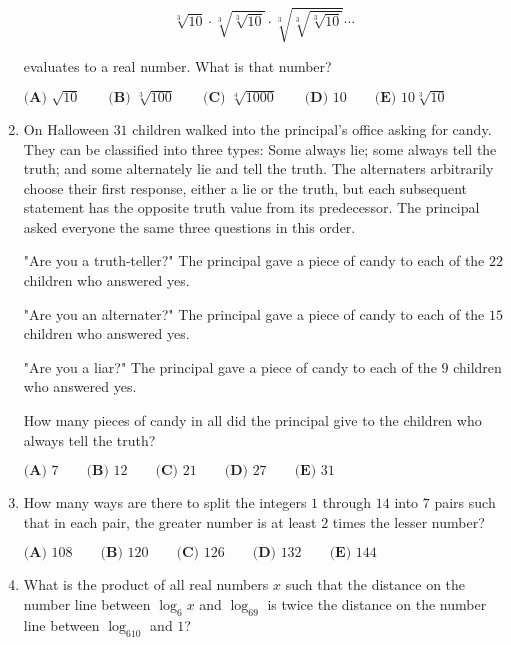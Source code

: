 \documentclass{article}
\begin{document}
\begin{enumerate}[label=\arabic*., itemsep=0.5em]
\begin{equation*}
\sqrt[3]{10} \cdot \sqrt[3]{\sqrt[3]{10}} \cdot \sqrt[3]{\sqrt[3]{\sqrt[3]{10}}} \cdots
\end{equation*}

evaluates to a real number. What is that number?

\(\textbf{(A) }\sqrt{10}\qquad\textbf{(B) }\sqrt[3]{100}\qquad\textbf{(C) }\sqrt[4]{1000}\qquad\textbf{(D) }10\qquad\textbf{(E) }10\sqrt[3]{10}\)\par \vspace{0.5em}\item On Halloween \(31\) children walked into the principal's office asking for candy. They
can be classified into three types: Some always lie; some always tell the truth; and
some alternately lie and tell the truth. The alternaters arbitrarily choose their first
response, either a lie or the truth, but each subsequent statement has the opposite
truth value from its predecessor. The principal asked everyone the same three
questions in this order.

"Are you a truth-teller?" The principal gave a piece of candy to each of the \(22\)
children who answered yes.

"Are you an alternater?" The principal gave a piece of candy to each of the \(15\)
children who answered yes.

"Are you a liar?" The principal gave a piece of candy to each of the \(9\) children who
answered yes.

How many pieces of candy in all did the principal give to the children who always
tell the truth?

\(\textbf{(A) } 7 \qquad \textbf{(B) } 12 \qquad \textbf{(C) } 21 \qquad \textbf{(D) } 27 \qquad \textbf{(E) } 31\)\par \vspace{0.5em}\item How many ways are there to split the integers \(1\) through \(14\) into \(7\) pairs such that in each pair, the greater number is at least \(2\) times the lesser number?

\(\textbf{(A) } 108 \qquad \textbf{(B) } 120 \qquad \textbf{(C) } 126 \qquad \textbf{(D) } 132 \qquad \textbf{(E) } 144\)\par \vspace{0.5em}\item What is the product of all real numbers \(x\) such that the distance on the number line between \(\log_6x\) and \(\log_69\) is twice the distance on the number line between \(\log_610\) and \(1\)?


\end{enumerate}
\end{document}
